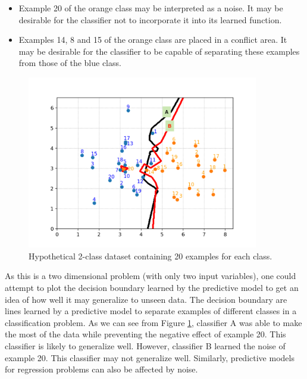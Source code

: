 \begin{itemize}
    \item Example 20 of the orange class may be interpreted as a noise. It may be desirable for the classifier not to incorporate it into its learned function.
    \item Examples 14, 8 and 15 of the orange class are placed in a conflict area. It may be desirable for the classifier to be capable of separating these examples from those of the blue class. %
\end{itemize}


\begin{figure}[h]
    \centering
    \includegraphics[width=0.9\textwidth]{"Part 3 - Learning Systems/Supervised Learning/Evaluation/figures/dataset1.png"}
    \caption{Hypothetical 2-class dataset containing 20 examples for each class.}
    \label{fig:ds1}
\end{figure}


As this is a two dimensional problem (with only two input variables), one could attempt to plot the decision boundary learned by the predictive model to get an idea of how well it may generalize to unseen data. The decision boundary are lines learned by a predictive model to separate examples of different classes in a classification problem. As we can see from Figure \ref{fig:ds1}, classifier A was able to make the most of the data while preventing the negative effect of example 20. This classifier is likely to generalize well. However, classifier B learned the noise of example 20. This classifier may not generalize well. Similarly, predictive models for regression problems can also be affected by noise.

